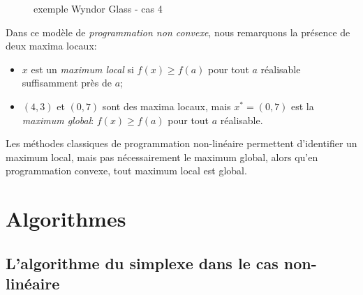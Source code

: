 \begin{example}
\begin{figure}[htbp]
\begin{center}
\end{center}
\caption{exemple Wyndor Glass - cas 4}
\label{fig:wyndor_nonlinear4}
\end{figure}
Dans ce modèle de {\sl programmation non convexe}, nous remarquons la présence de deux maxima locaux:
\begin{itemize}
	\item
	$x$ est un {\sl maximum local} si $f(x) \geq f(a)$ pour tout $a$ réalisable suffisamment près de $a$;
	\item
	$(4,3)$ et $(0,7)$ sont des maxima locaux, mais $x^* = (0,7)$ est la {\sl maximum global}: $f(x) \geq f(a)$ pour tout $a$ réalisable.
\end{itemize}
Les méthodes classiques de programmation non-linéaire permettent d'identifier un maximum local, mais pas nécessairement le maximum global, alors qu'en programmation convexe, tout maximum local est global.
\end{example}

\section{Algorithmes}

\subsection{L'algorithme du simplexe dans le cas non-linéaire}

